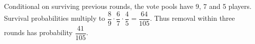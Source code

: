 Conditional on surviving previous rounds, the vote pools have 9, 7 and 5 players. Survival probabilities multiply to $\dfrac{8}{9}\cdot\dfrac{6}{7}\cdot\dfrac{4}{5}=\dfrac{64}{105}$. Thus removal within three rounds has probability $\boxed{\dfrac{41}{105}}$.
